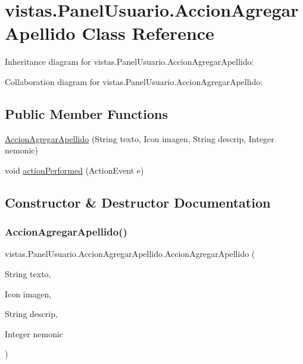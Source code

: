 \hypertarget{classvistas_1_1_panel_usuario_1_1_accion_agregar_apellido}{}\section{vistas.\+Panel\+Usuario.\+Accion\+Agregar\+Apellido Class Reference}
\label{classvistas_1_1_panel_usuario_1_1_accion_agregar_apellido}


Inheritance diagram for vistas.\+Panel\+Usuario.\+Accion\+Agregar\+Apellido\+:


Collaboration diagram for vistas.\+Panel\+Usuario.\+Accion\+Agregar\+Apellido\+:
\subsection*{Public Member Functions}
\begin{DoxyCompactItemize}
\item 
\mbox{\hyperlink{classvistas_1_1_panel_usuario_1_1_accion_agregar_apellido_a3ff7be938ab631f3fabeae7d354ca114}{Accion\+Agregar\+Apellido}} (String texto, Icon imagen, String descrip, Integer nemonic)
\item 
void \mbox{\hyperlink{classvistas_1_1_panel_usuario_1_1_accion_agregar_apellido_ac651cbb5fab14cdf904bc5cef9b53d05}{action\+Performed}} (Action\+Event e)
\end{DoxyCompactItemize}


\subsection{Constructor \& Destructor Documentation}
\mbox{\label{classvistas_1_1_panel_usuario_1_1_accion_agregar_apellido_a3ff7be938ab631f3fabeae7d354ca114}} 
\subsubsection{\texorpdfstring{Accion\+Agregar\+Apellido()}{AccionAgregarApellido()}}
{\footnotesize\ttfamily vistas.\+Panel\+Usuario.\+Accion\+Agregar\+Apellido.\+Accion\+Agregar\+Apellido (\begin{DoxyParamCaption}\item[{String}]{texto,  }\item[{Icon}]{imagen,  }\item[{String}]{descrip,  }\item[{Integer}]{nemonic }\end{DoxyParamCaption})\hspace{0.3cm}{\ttfamily [inline]}}

